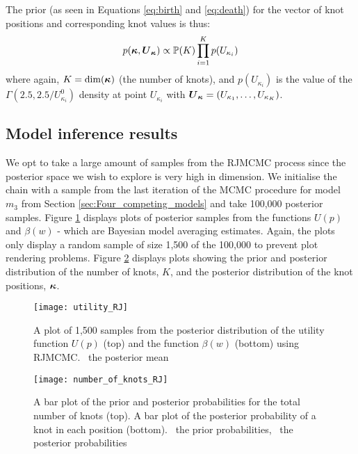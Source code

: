 The prior (as seen in Equations \ref{eq:birth} and \ref{eq:death}) for the vector of knot positions and corresponding
knot values is thus:
\begin{align} 
p(\boldsymbol{\kappa}, \boldsymbol{U}_{\boldsymbol{\kappa}}) \propto \mathbb{P}(K) \prod_{i = 1}^K p(U_{\kappa_i})
\end{align}
where again, \(K = \dim(\boldsymbol{\kappa})\) (the number of knots), and \(p(U_{\kappa_i})\) is the value of the \(\Gamma(2.5,
2.5 / U^0_{\kappa_i})\) density at point \(U_{\kappa_i}\) with \(\boldsymbol{U}_{\boldsymbol{\kappa}} = (U_{\kappa_1}, \ldots,
U_{\kappa_K})\).

\subsection{Model inference results}
\label{Model_inference_results2}

We opt to take a large amount of samples from the \gls{RJMCMC} process since the posterior space we wish to explore is
very high in dimension. We initialise the chain with a sample from the last iteration of the \gls{MCMC} procedure for
model \(m_3\) from Section \ref{sec:Four_competing_models} and take 100,000 posterior samples. Figure
\ref{fig:utility_RJ} displays plots of posterior samples from the functions \(U(p)\) and \(\beta(w)\) - which are
Bayesian model averaging estimates. Again, the plots only display a random sample of size 1,500 of the 100,000 to
prevent plot rendering problems. Figure \ref{fig:number_of_knots_RJ} displays plots showing the prior and posterior
distribution of the number of knots, \(K\), and the posterior distribution of the knot positions, \(\boldsymbol{\kappa}\).
\begin{figure}[htp]
\begin{center}
  \texttt{[image: utility\_RJ]}
  \caption{\label{fig:utility_RJ} A plot of 1,500 samples from the posterior distribution of the utility function
  \(U(p)\) (top) and the function \(\beta(w)\) (bottom) using RJMCMC. \protect\redSolidLine\ the posterior mean}
\end{center}
\end{figure}
%
\begin{figure}[htp]
\begin{center}
  \texttt{[image: number\_of\_knots\_RJ]}
  \caption{\label{fig:number_of_knots_RJ} A bar plot of the prior and posterior probabilities for the total number of
  knots (top). A bar plot of the posterior probability of a knot in each position (bottom). \protect\redBox\ the prior
  probabilities, \protect\blueBox\ the posterior probabilities}
\end{center}
\end{figure}

